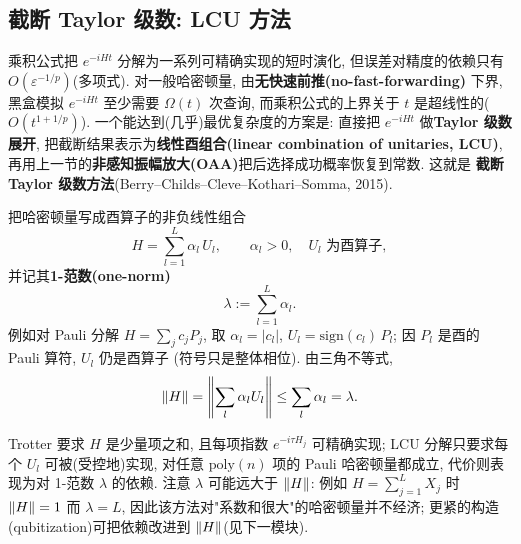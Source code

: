 \documentclass[utf8]{article} %
\numberwithin{equation}{section}   %
\newtheorem{Def}{\hskip 2em {\color{green} 定义}}[subsection]
\newtheorem{Note}{\hskip 2em {\color{red} 注}}[subsection]
\begin{document}
\subsection{截断 Taylor 级数: LCU 方法}

乘积公式把 $e^{-iHt}$ 分解为一系列可精确实现的短时演化, 但误差对精度的依赖只有
$O(\varepsilon^{-1/p})$(多项式). 对一般哈密顿量, 由\textbf{无快速前推(no-fast-forwarding)}
下界, 黑盒模拟 $e^{-iHt}$ 至少需要 $\Omega(t)$ 次查询, 而乘积公式的上界关于 $t$
是超线性的($O(t^{1+1/p})$). 一个能达到(几乎)最优复杂度的方案是: 直接把 $e^{-iHt}$
做\textbf{Taylor 级数展开}, 把截断结果表示为\textbf{线性酉组合(linear combination of unitaries, LCU)},
再用上一节的\textbf{非感知振幅放大(OAA)}把后选择成功概率恢复到常数. 这就是
\textbf{截断 Taylor 级数方法}(Berry--Childs--Cleve--Kothari--Somma, 2015).

\begin{Def}
    把哈密顿量写成酉算子的非负线性组合
    \begin{equation}
        H = \sum_{l=1}^{L} \alpha_l\, U_l, \qquad \alpha_l > 0, \quad U_l \text{ 为酉算子},
    \end{equation}
    并记其\textbf{1-范数(one-norm)}
    \begin{equation}
        \lambda := \sum_{l=1}^{L} \alpha_l.
    \end{equation}
    例如对 Pauli 分解 $H = \sum_j c_j P_j$, 取 $\alpha_l = |c_l|$,
    $U_l = \mathrm{sign}(c_l)\, P_l$; 因 $P_l$ 是酉的 Pauli 算符, $U_l$ 仍是酉算子
    (符号只是整体相位). 由三角不等式,
    \begin{equation}
        \norm{H} = \norm{\sum_l \alpha_l U_l} \le \sum_l \alpha_l = \lambda.
    \end{equation}
\end{Def}

\begin{Note}[与乘积公式的对比]
    Trotter 要求 $H$ 是少量项之和, 且每项指数 $e^{-i\tau H_j}$ 可精确实现;
    LCU 分解只要求每个 $U_l$ 可被(受控地)实现, 对任意 $\mathrm{poly}(n)$ 项的
    Pauli 哈密顿量都成立, 代价则表现为对 1-范数 $\lambda$ 的依赖. 注意 $\lambda$
    可能远大于 $\norm{H}$: 例如 $H = \sum_{j=1}^{L} X_j$ 时 $\norm{H} = 1$ 而
    $\lambda = L$, 因此该方法对"系数和很大"的哈密顿量并不经济; 更紧的构造
    (qubitization)可把依赖改进到 $\norm{H}$(见下一模块).
\end{Note}
\end{document}
